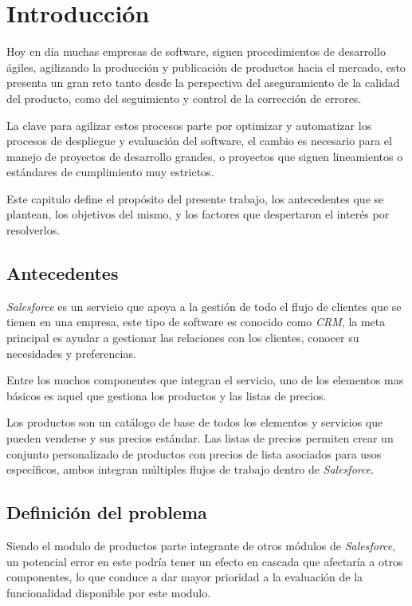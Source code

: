 \chapter{Introducción}

Hoy en día muchas empresas de software, siguen procedimientos de desarrollo
ágiles, agilizando la producción y publicación de productos hacia el mercado,
esto presenta un gran reto tanto desde la perspectiva del aseguramiento de la
calidad del producto, como del seguimiento y control de la corrección de
errores.

La clave para agilizar estos procesos parte por optimizar y automatizar los
procesos de despliegue y evaluación del software, el cambio es necesario para
el manejo de proyectos de desarrollo grandes, o proyectos que siguen
lineamientos o estándares de cumplimiento muy estrictos.

Este capitulo define el propósito del presente trabajo, los antecedentes que se
plantean, los objetivos del mismo, y los factores que despertaron el interés
por resolverlos.

\section{Antecedentes}
\emph{Salesforce} es un servicio que apoya a la gestión de todo el flujo de
clientes que se tienen en una empresa, este tipo de software es  conocido como
\emph{CRM}, la meta principal es ayudar a gestionar las relaciones con los
clientes, conocer su necesidades y preferencias.

Entre los muchos componentes que integran el servicio, uno de los elementos mas
básicos es aquel que gestiona los productos y las listas de precios.

Los productos son un catálogo de base de todos los elementos y servicios que
pueden venderse y sus precios estándar. Las listas de precios permiten crear un
conjunto personalizado de productos con precios de lista asociados para usos
específicos, ambos integran múltiples flujos de trabajo dentro de
\emph{Salesforce}.

\section{Definición del problema}
Siendo el modulo de productos parte integrante de otros módulos de
\emph{Salesforce}, un potencial error en este podría tener un efecto en cascada
que afectaría a otros componentes, lo que conduce a dar mayor prioridad a la
evaluación de la funcionalidad disponible por este modulo.

